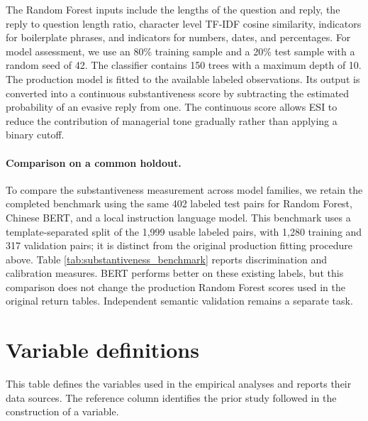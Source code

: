 \documentclass[12pt]{article}
\begin{document}
The Random Forest inputs include the lengths of the question and reply, the reply to question length ratio, character level TF-IDF cosine similarity, indicators for boilerplate phrases, and indicators for numbers, dates, and percentages. For model assessment, we use an 80\% training sample and a 20\% test sample with a random seed of 42. The classifier contains 150 trees with a maximum depth of 10. The production model is fitted to the available labeled observations. Its output is converted into a continuous substantiveness score by subtracting the estimated probability of an evasive reply from one. The continuous score allows ESI to reduce the contribution of managerial tone gradually rather than applying a binary cutoff.

\paragraph{Comparison on a common holdout.}
To compare the substantiveness measurement across model families, we retain the completed benchmark using the same 402 labeled test pairs for Random Forest, Chinese BERT, and a local instruction language model. This benchmark uses a template-separated split of the 1,999 usable labeled pairs, with 1,280 training and 317 validation pairs; it is distinct from the original production fitting procedure above. Table \ref{tab:substantiveness_benchmark} reports discrimination and calibration measures. BERT performs better on these existing labels, but this comparison does not change the production Random Forest scores used in the original return tables. Independent semantic validation remains a separate task.
\setcounter{table}{0}
\renewcommand{\thetable}{B\arabic{table}}
\renewcommand{\theHtable}{B\arabic{table}}

\clearpage
\setcounter{table}{0}
\renewcommand{\thetable}{C\arabic{table}}
\renewcommand{\theHtable}{C\arabic{table}}
\section{Variable definitions} \label{app:variable_definitions}

This table defines the variables used in the empirical analyses and reports their data sources. The reference column identifies the prior study followed in the construction of a variable.
\end{document}
